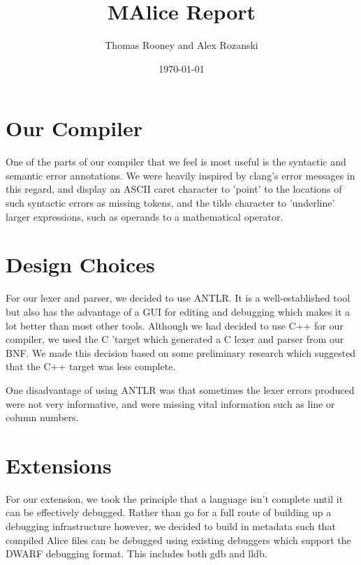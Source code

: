 \documentclass[a4wide, 11pt]{article}
\begin{document}
\title{MAlice Report}

\author{Thomas Rooney and Alex Rozanski}

\date{\today}

\maketitle

\section{Our Compiler}

One of the parts of our compiler that we feel is most useful is the syntactic and semantic error annotations. We were heavily inspired by clang's error messages in this regard, and display an ASCII caret character to 'point' to the locations of such syntactic errors as missing tokens, and the tilde character to 'underline' larger expressions, such as operands to a mathematical operator.

\section{Design Choices}

For our lexer and parser, we decided to use ANTLR. It is a well-established tool but also has the advantage of a GUI for editing and debugging which makes it a lot better than most other tools. Although we had decided to use C++ for our compiler, we used the C 'target which generated a C lexer and parser from our BNF. We made this decision based on some preliminary research which suggested that the C++ target was less complete.

One disadvantage of using ANTLR was that sometimes the lexer errors produced were not very informative, and were missing vital information such as line or column numbers.

\section{Extensions}

For our extension, we took the principle that a language isn't complete until it can be effectively debugged. Rather than go for a full route of building up a debugging infrastructure however, we decided to build in metadata such that compiled Alice files can be debugged using existing debuggers which support the DWARF debugging format. This includes both gdb and lldb.
\end{document}
